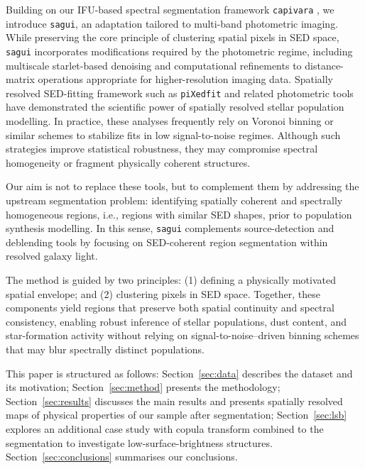 \documentclass[fleqn,usenatbib]{mnras}
\begin{document}
Building on our IFU-based spectral segmentation framework \texttt{capivara} \citep{capivara2025}, we introduce \texttt{sagui}, an adaptation tailored to multi-band photometric imaging. While preserving the core principle of clustering spatial pixels in SED space, \texttt{sagui} incorporates modifications required by the photometric regime, including multiscale starlet-based denoising \citep{starck_murtagh_2006} and computational refinements to distance-matrix operations appropriate for higher-resolution imaging data. Spatially resolved SED-fitting framework such as \texttt{piXedfit} \citep{piXedfit2021} and related photometric tools have demonstrated the scientific power of spatially resolved stellar population modelling. In practice, these analyses frequently rely on Voronoi binning or similar schemes to stabilize fits in low signal-to-noise regimes. Although such strategies improve statistical robustness, they may compromise spectral homogeneity or fragment physically coherent structures.

Our aim is not to replace these tools, but to complement them by addressing the upstream segmentation problem: identifying spatially coherent and spectrally homogeneous regions, i.e., regions with similar SED shapes, prior to population synthesis modelling. In this sense, \texttt{sagui} complements source-detection and deblending tools by focusing on SED-coherent region segmentation within resolved galaxy light.


The method is guided by two principles: (1) defining a physically motivated spatial envelope; and (2) clustering pixels in SED space.
Together, these components yield regions that preserve both spatial continuity and spectral consistency, enabling robust inference of stellar populations, dust content, and star-formation activity without relying on signal-to-noise–driven binning schemes that may blur spectrally distinct populations. 

This paper is structured as follows: Section~\ref{sec:data} describes the dataset and its motivation; Section~\ref{sec:method} presents the methodology; Section~\ref{sec:results} discusses the main results and presents spatially resolved maps of physical properties of our sample after segmentation; Section~\ref{sec:lsb} explores an additional case study with copula transform combined to the segmentation to investigate low-surface-brightness structures. Section~\ref{sec:conclusions} summarises our conclusions.
\end{document}
